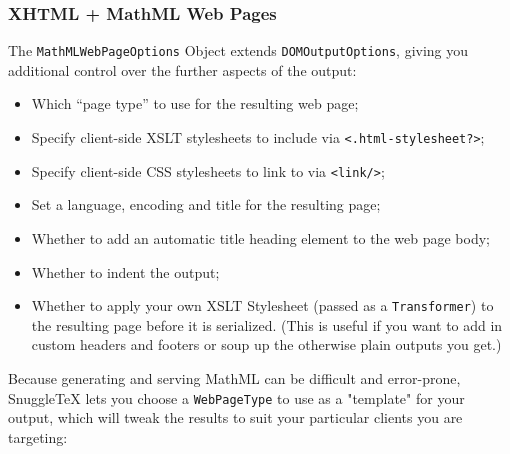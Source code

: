 \subsubsection*{XHTML + MathML Web Pages}

The \verb|MathMLWebPageOptions| Object extends \verb|DOMOutputOptions|,
giving you additional control over the further aspects of the output:

\begin{itemize}
  \item Which ``page type'' to use for the resulting web page;
  \item Specify client-side XSLT stylesheets to include via \verb|<.html-stylesheet?>|;
  \item Specify client-side CSS stylesheets to link to via \verb|<link/>|;
  \item Set a language, encoding and title for the resulting page;
  \item Whether to add an automatic title heading element to the web page body;
  \item Whether to indent the output;
  \item Whether to apply your own XSLT Stylesheet (passed as a \verb|Transformer|) to
    the resulting page before it is serialized. (This is useful if you want to add
    in custom headers and footers or soup up the otherwise plain outputs you get.)
\end{itemize}

Because generating and serving MathML can be difficult and error-prone, SnuggleTeX lets
you choose a \verb|WebPageType| to use as a "template" for your output, which will tweak
the results to suit your particular clients you are targeting:

